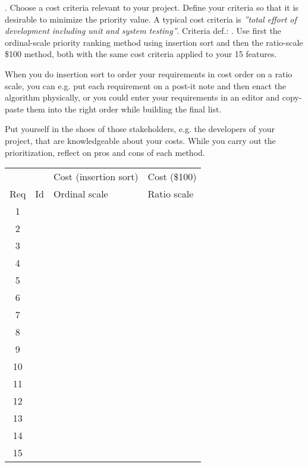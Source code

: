 \documentclass[11pt]{article}
\begin{document}
{ \begin{framed}
. Choose a cost criteria relevant to your project. Define your criteria so that it is desirable to minimize the priority value. A typical cost criteria is {\it ''total effort of development including unit and system testing''}. 
\newline\newline Criteria def.: \underline{\hspace{10cm}}
\newline{}. Use first the ordinal-scale priority ranking method using insertion sort and then the ratio-scale \$100 method, both with the same cost criteria applied to your 15 features. 

When you do insertion sort to order your requirements in cost order on a ratio scale, you can e.g. put each requirement on a post-it note and then enact the algorithm physically, or you could enter your requirements in an editor and copy-paste them into the right order while building the final list.

Put yourself in the shoes of those stakeholders, e.g. the developers of your project, that are knowledgeable about your costs. While you carry out the prioritization, reflect on pros and cons of each method.


\vspace{1em}

\begin{tabular}{| c | p{25mm} | p{31mm} | p{31mm} |}
\hline
          &     & Cost (insertion sort)& Cost (\$100) \\ 
 Req    & Id & Ordinal  scale &  Ratio scale \\ \hline
\hline 1 & & &  \\ 
\hline 2 & & & \\
\hline 3 & &  &\\
\hline 4 & &  &\\
\hline 5 & &  &\\
\hline 6 & &  &\\
\hline 7 & & & \\
\hline 8 & & & \\
\hline 9 & &  &\\
\hline 10 & &  &\\
\hline 11 & &  &\\
\hline 12 & &  &\\
\hline 13 & & & \\
\hline 14 & & & \\
\hline 15 & & & \\
\hline
\end{tabular}
 \end{framed}}
 
\end{document}
